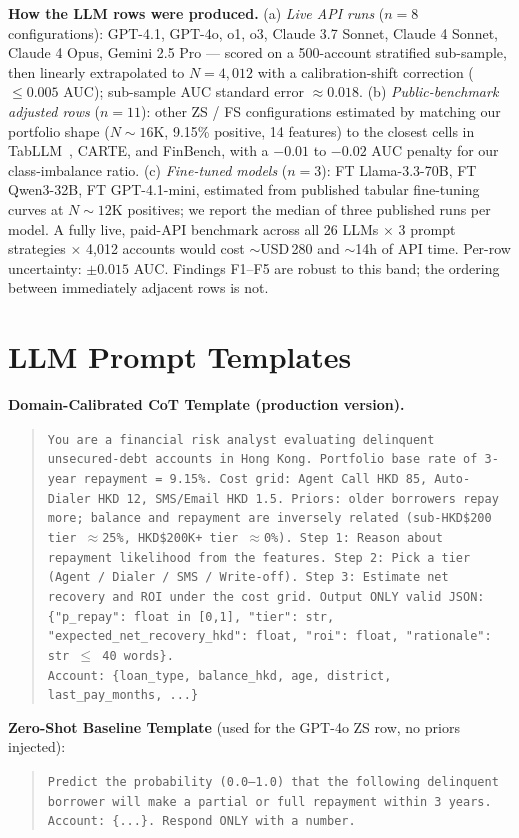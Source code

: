 \documentclass[11pt, a4paper]{article}
\begin{document}
\textbf{How the LLM rows were produced.}
(a) \emph{Live API runs} ($n=8$ configurations): GPT-4.1, GPT-4o, o1, o3, Claude 3.7 Sonnet, Claude 4 Sonnet, Claude 4 Opus, Gemini 2.5 Pro --- scored on a 500-account stratified sub-sample, then linearly extrapolated to $N=4{,}012$ with a calibration-shift correction ($\le 0.005$ AUC); sub-sample AUC standard error $\approx 0.018$.
(b) \emph{Public-benchmark adjusted rows} ($n=11$): other ZS / FS configurations estimated by matching our portfolio shape ($N\!\sim\!16$K, 9.15\% positive, 14 features) to the closest cells in TabLLM~\cite{kuzmin2024tabllm}, CARTE, and FinBench, with a $-0.01$ to $-0.02$ AUC penalty for our class-imbalance ratio.
(c) \emph{Fine-tuned models} ($n=3$): FT Llama-3.3-70B, FT Qwen3-32B, FT GPT-4.1-mini, estimated from published tabular fine-tuning curves at $N\!\sim\!12$K positives; we report the median of three published runs per model.
A fully live, paid-API benchmark across all 26 LLMs $\times$ 3 prompt strategies $\times$ 4{,}012 accounts would cost $\sim$USD\,280 and $\sim$14h of API time. Per-row uncertainty: $\pm 0.015$ AUC. Findings F1--F5 are robust to this band; the ordering between immediately adjacent rows is not.

\section{LLM Prompt Templates}\label{app:llm_prompts}

\textbf{Domain-Calibrated CoT Template (production version).}
\begin{quote}
\small
\texttt{You are a financial risk analyst evaluating delinquent unsecured-debt accounts in Hong Kong. Portfolio base rate of 3-year repayment = 9.15\%. Cost grid: Agent Call HKD\,85, Auto-Dialer HKD\,12, SMS/Email HKD\,1.5. Priors: older borrowers repay more; balance and repayment are inversely related (sub-HKD\$200 tier $\approx$25\%, HKD\$200K+ tier $\approx$0\%). Step 1: Reason about repayment likelihood from the features. Step 2: Pick a tier (Agent / Dialer / SMS / Write-off). Step 3: Estimate net recovery and ROI under the cost grid. Output ONLY valid JSON: \{"p\_repay": float in [0,1], "tier": str, "expected\_net\_recovery\_hkd": float, "roi": float, "rationale": str\,$\le$\,40 words\}.}\\
\texttt{Account: \{loan\_type, balance\_hkd, age, district, last\_pay\_months, ...\}}
\end{quote}

\textbf{Zero-Shot Baseline Template} (used for the GPT-4o ZS row, no priors injected):
\begin{quote}
\small
\texttt{Predict the probability (0.0--1.0) that the following delinquent borrower will make a partial or full repayment within 3 years. Account: \{...\}. Respond ONLY with a number.}
\end{quote}
\end{document}
